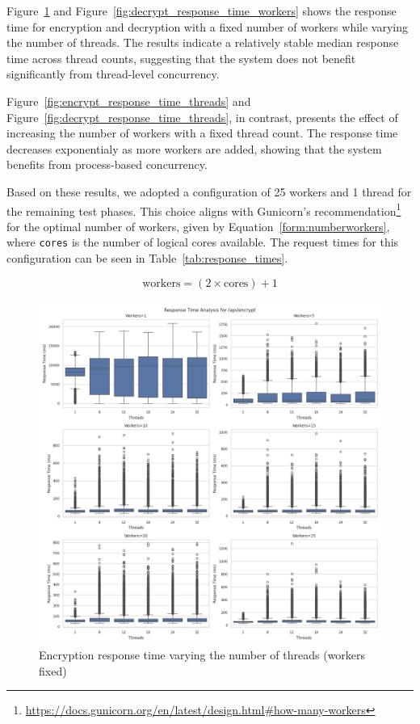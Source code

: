 \documentclass[cic,tc,english]{iiufrgs}
\begin{document}
        Figure~\ref{fig:encrypt_response_time_workers} and Figure~\ref{fig:decrypt_response_time_workers} shows the response time for encryption and decryption with a fixed number of workers while varying the number of threads. The results indicate a relatively stable median response time across thread counts, suggesting that the system does not benefit significantly from thread-level concurrency.

        Figure~\ref{fig:encrypt_response_time_threads} and Figure~\ref{fig:decrypt_response_time_threads}, in contrast, presents the effect of increasing the number of workers with a fixed thread count. The response time decreases exponentialy as more workers are added, showing that the system benefits from process-based concurrency.

        Based on these results, we adopted a configuration of 25 workers and 1 thread for the remaining test phases. This choice aligns with Gunicorn's recommendation\footnote{\url{https://docs.gunicorn.org/en/latest/design.html\#how-many-workers}} for the optimal number of workers, given by Equation~\ref{form:numberworkers}, where \texttt{cores} is the number of logical cores available. The request times for this configuration can be seen in Table~\ref{tab:response_times}.

        \begin{equation}
            \label{form:numberworkers}
            \text{workers} = (2 \times \text{cores}) + 1
        \end{equation}

        \begin{figure}
            \centering
            \includegraphics[width=\textwidth]{images/phase1/api_encrypt/response_time_workers_summary.png}
            \caption{Encryption response time varying the number of threads (workers fixed)}
            \label{fig:encrypt_response_time_workers}
        \end{figure}
\end{document}

